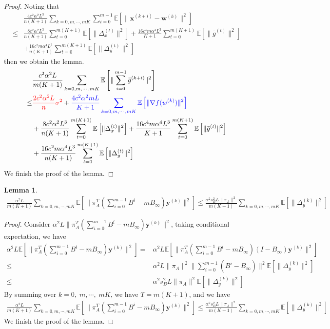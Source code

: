 \documentclass{article}
\newtheorem{lemma}[thm]{Lemma}
\newcommand{\vw}{{\mathbf{w}}}
\newcommand{\vx}{{\mathbf{x}}}
\newcommand{\vy}{{\mathbf{y}}}
\newcommand{\EE}[1]{\mathbb{E}\left[#1\right]}
\newcommand{\norm}[1]{\| #1 \|}
\begin{document}
\begin{proof}
Noting that 
\begin{align*}
  &\frac{4c^2\alpha^2L^3}{n(K+1)}\sum_{k=0,m,\cdots,mK}\sum_{i=0}^{m-1}\EE{\norm{\vx^{(k+i)}-\vw^{(k)}}^2}\\  \leq&\frac{8c^2\alpha^2L^3}{n(K+1)}\sum_{t=0}^{m(K+1)}\EE{\norm{\Delta_x^{(t)}}^2}+\frac{16c^4m\alpha^4L^3}{K+1}\sum_{t=0}^{m(K+1)}\EE{\norm{\bar{g}^{(t)}}^2}\\&+\frac{16c^2m\alpha^4L^3}{n(K+1)}\sum_{t=0}^{m(K+1)}\EE{\norm{\Delta_y^{(t)}}^2}
\end{align*}
then we obtain the lemma.
\begin{align*}
  &\frac{c^2\alpha^2L}{m(K+1)}\sum_{k=0,m,\cdots,mK}\EE{\norm{\sum_{i=0}^{m-1}\bar{g}^{(k+i)}}^2}
  \\ \leq& \textcolor{red}{ \frac{2c^2\alpha^2L}{n}\sigma^2}+ \textcolor{blue}{\frac{4c^2\alpha^2mL}{K+1}\sum_{k=0,m,\cdots,mK}\EE{\norm{\nabla f(w^{(k)})}^2}}\\&+\frac{8c^2\alpha^2L^3}{n(K+1)}\sum_{t=0}^{m(K+1)}\EE{\norm{\Delta_x^{(t)}}^2}+\frac{16c^4m\alpha^4L^3}{K+1}\sum_{t=0}^{m(K+1)}\EE{\norm{\bar{g}^{(t)}}^2}\\&+\frac{16c^2m\alpha^4L^3}{n(K+1)}\sum_{t=0}^{m(K+1)}\EE{\norm{\Delta_y^{(t)}}^2}
\end{align*}
We finish the proof of the lemma.
\end{proof}

\begin{lemma}
  \begin{align*}
    \frac{\alpha^2L}{m(K+1)}\sum_{k=0,m,\cdots,mK}\EE{\norm{\pi_A^T(\sum_{i=0}^{m-1}B^i - m B_{\infty})\vy^{(k)}}^2}\leq \frac{\alpha^2s_B^2L\norm{\pi_A}^2}{m(K+1)}\sum_{k=0,m,\cdots,mK}\EE{\norm{\Delta_y^{(k)}}^2}
  \end{align*}
\end{lemma}

\begin{proof}
  Consider $\alpha^2L\norm{\pi_A^T(\sum_{i=0}^{m-1}B^i - m B_{\infty})\vy^{(k)}}^2$, taking conditional expectation, we have
  \begin{align*}
    \alpha^2L\EE{\norm{\pi_A^T(\sum_{i=0}^{m-1}B^i - m B_{\infty})\vy^{(k)}}^2}=&\alpha^2L\EE{\norm{\pi_A^T(\sum_{i=0}^{m-1}B^i - m B_{\infty})(I-B_{\infty})\vy^{(k)}}^2}\\
    \leq & \alpha^2L\norm{\pi_A}^2\norm{\sum_{i=0}^{m-1}(B^i-B_{\infty})}^2\EE{\norm{\Delta_y^{(k)}}^2}\\ 
    \leq & \alpha^2s_B^2L\norm{\pi_A}^2\EE{\norm{\Delta_y^{(k)}}^2}
  \end{align*}
  By summing over $k=0,\;m,\cdots,\;mK$, we have $T=m(K+1)$, and we have
  \begin{align*}
    \frac{\alpha^2L}{m(K+1)}\sum_{k=0,m,\cdots,mK}\EE{\norm{\pi_A^T(\sum_{i=0}^{m-1}B^i - m B_{\infty})\vy^{(k)}}^2}\leq \frac{\alpha^2s_B^2L\norm{\pi_A}^2}{m(K+1)}\sum_{k=0,m,\cdots,mK}\EE{\norm{\Delta_y^{(k)}}^2}
  \end{align*}
  We finish the proof of the lemma.
\end{proof}
\end{document}
